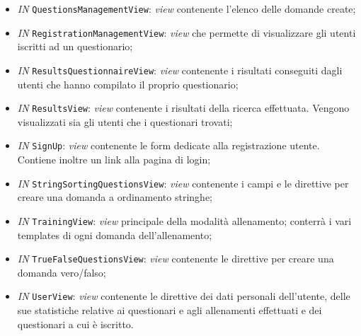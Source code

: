 \begin{itemize}
\begin{itemize}
			\item \textit{IN} \texttt{QuestionsManagementView}: \textit{view} contenente l'elenco delle domande create; 
			\item \textit{IN} \texttt{RegistrationManagementView}: \textit{view} che permette di visualizzare gli utenti iscritti ad un questionario;
			\item \textit{IN} \texttt{ResultsQuestionnaireView}: \textit{view} contenente i risultati conseguiti dagli utenti che hanno compilato il proprio questionario;
			\item \textit{IN} \texttt{ResultsView}: \textit{view} contenente i risultati della ricerca effettuata. Vengono visualizzati sia gli utenti che i questionari trovati;
			\item \textit{IN} \texttt{SignUp}:  \textit{view} contenente le form dedicate alla registrazione utente. Contiene inoltre un link alla pagina di login;
			\item \textit{IN} \texttt{StringSortingQuestionsView}:  \textit{view} contenente i campi e le direttive per creare una domanda a ordinamento stringhe; 
			\item \textit{IN} \texttt{TrainingView}: \textit{view} principale della modalità allenamento; conterrà i vari templates di ogni domanda dell'allenamento;
			\item \textit{IN} \texttt{TrueFalseQuestionsView}: \textit{view} contenente le direttive per creare una domanda vero/falso;
			\item \textit{IN} \texttt{UserView}:  \textit{view} contenente le direttive dei dati personali dell'utente, delle sue statistiche relative ai questionari e agli allenamenti effettuati e dei questionari a cui è iscritto.
		\end{itemize}
	\end{itemize}
